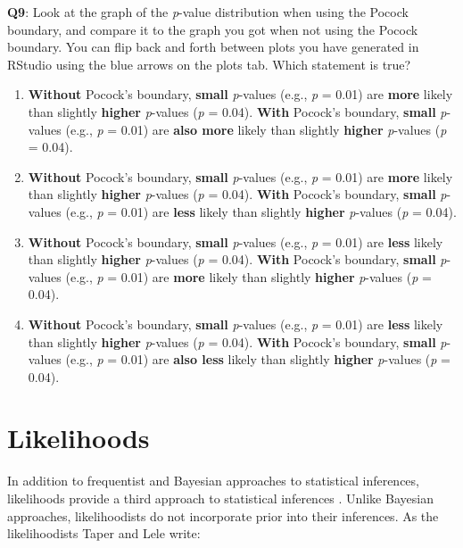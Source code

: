\documentclass[
]{krantz}
\providecommand{\tightlist}{%
  \setlength{\itemsep}{0pt}\setlength{\parskip}{0pt}}
\begin{document}
\textbf{Q9}: Look at the graph of the \emph{p}-value distribution when using the Pocock boundary, and compare it to the graph you got when not using the Pocock boundary. You can flip back and forth between plots you have generated in RStudio using the blue arrows on the plots tab. Which statement is true?

\begin{enumerate}
\def\labelenumi{\Alph{enumi})}
\tightlist
\item
  \textbf{Without} Pocock's boundary, \textbf{small} \emph{p}-values (e.g., \emph{p} = 0.01) are
  \textbf{more} likely than slightly \textbf{higher} \emph{p}-values (\emph{p} = 0.04). \textbf{With}
  Pocock's boundary, \textbf{small} \emph{p}-values (e.g., \emph{p} = 0.01) are \textbf{also more}
  likely than slightly \textbf{higher} \emph{p}-values (\emph{p} = 0.04).
\item
  \textbf{Without} Pocock's boundary, \textbf{small} \emph{p}-values (e.g., \emph{p} = 0.01) are
  \textbf{more} likely than slightly \textbf{higher} \emph{p}-values (\emph{p} = 0.04). \textbf{With}
  Pocock's boundary, \textbf{small} \emph{p}-values (e.g., \emph{p} = 0.01) are \textbf{less} likely
  than slightly \textbf{higher} \emph{p}-values (\emph{p} = 0.04).
\item
  \textbf{Without} Pocock's boundary, \textbf{small} \emph{p}-values (e.g., \emph{p} = 0.01) are
  \textbf{less} likely than slightly \textbf{higher} \emph{p}-values (\emph{p} = 0.04). \textbf{With}
  Pocock's boundary, \textbf{small} \emph{p}-values (e.g., \emph{p} = 0.01) are \textbf{more} likely
  than slightly \textbf{higher} \emph{p}-values (\emph{p} = 0.04).
\item
  \textbf{Without} Pocock's boundary, \textbf{small} \emph{p}-values (e.g., \emph{p} = 0.01) are
  \textbf{less} likely than slightly \textbf{higher} \emph{p}-values (\emph{p} = 0.04). \textbf{With}
  Pocock's boundary, \textbf{small} \emph{p}-values (e.g., \emph{p} = 0.01) are \textbf{also less}
  likely than slightly \textbf{higher} \emph{p}-values (\emph{p} = 0.04).
\end{enumerate}

\hypertarget{likelihoods}{%
\chapter{Likelihoods}\label{likelihoods}}

In addition to frequentist and Bayesian approaches to statistical inferences, likelihoods provide a third approach to statistical inferences \citep{pawitan_all_2001}. Unlike Bayesian approaches, likelihoodists do not incorporate prior into their inferences. As the likelihoodists Taper and Lele \citeyearpar{taper_philosophy_2011} write:
\end{document}
